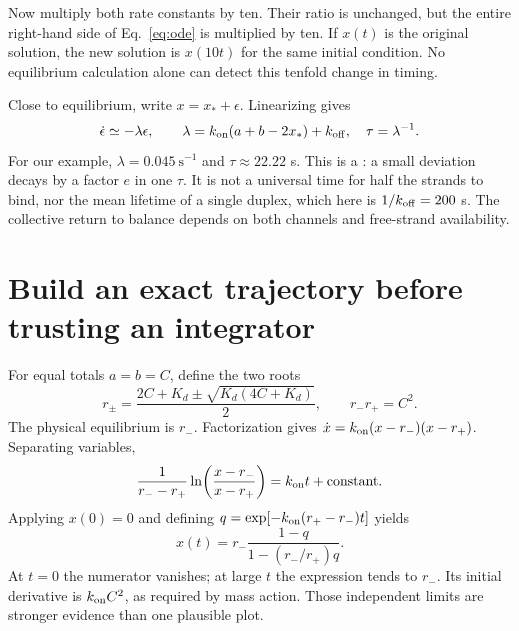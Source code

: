 Now multiply both rate constants by ten. Their ratio is unchanged,
but the entire right-hand side of Eq.~\ref{eq:ode} is multiplied by ten.
If $x(t)$ is the original solution, the new solution is $x(10t)$
for the same initial condition. No equilibrium calculation alone can detect
this tenfold change in timing.


Close to equilibrium, write $x=x_*+\epsilon$. Linearizing gives
\begin{equation}
 \dot\epsilon\simeq-\lambda\epsilon,\qquad
 \lambda=k_{\rm on}(a+b-2x_*)+k_{\rm off},
 \quad \tau=\lambda^{-1}.
\end{equation}
For our example, $\lambda=0.045\ \mathrm{s}^{-1}$ and $\tau\approx22.22$ s.
This is a : a small deviation decays by a factor $e$
in one $\tau$. It is not a universal time for half the strands to bind,
nor the mean lifetime of a single duplex, which here is $1/k_{\rm off}=200$ s.
The collective return to balance depends on both channels and free-strand
availability.

\section{Build an exact trajectory before trusting an integrator}

For equal totals $a=b=C$, define the two roots
\begin{equation}
 r_\pm=\frac{2C+K_d\pm\sqrt{K_d(4C+K_d)}}2,\qquad
 r_-r_+=C^2.
\end{equation}
The physical equilibrium is $r_-$. Factorization gives
$\dot x=k_{\rm on}(x-r_-)(x-r_+)$. Separating variables,
\begin{equation}
 \frac1{r_--r_+}\ln\!\left(\frac{x-r_-}{x-r_+}\right)
   =k_{\rm on}t+\text{constant}.
\end{equation}
Applying $x(0)=0$ and defining
$q=\exp[-k_{\rm on}(r_+-r_-)t]$ yields
\begin{equation}
 x(t)=r_-\frac{1-q}{1-(r_-/r_+)q}.
 \label{eq:exact}
\end{equation}
At $t=0$ the numerator vanishes; at large $t$ the expression tends to $r_-$.
Its initial derivative is $k_{\rm on}C^2$, as required by mass action.
Those independent limits are stronger evidence than one plausible plot.

